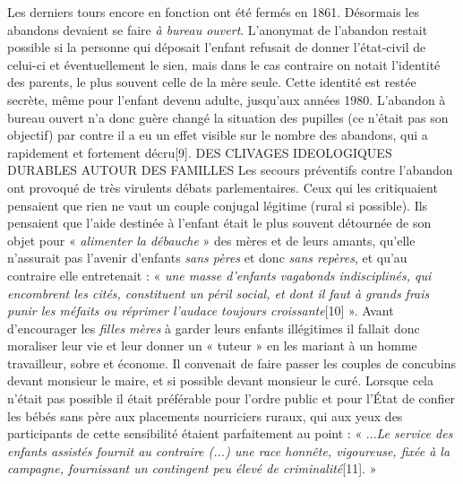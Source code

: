  Les derniers tours encore en fonction ont été fermés en 1861. Désormais les abandons devaient se faire \emph{à bureau ouvert}. L'anonymat de l'abandon restait possible si la personne qui déposait l'enfant refusait de donner l'état-civil de celui-ci et éventuellement le sien, mais dans le cas contraire on notait l'identité des parents, le plus souvent celle de la mère seule. Cette identité est restée secrète, même pour l'enfant devenu adulte, jusqu'aux années 1980. L'abandon à bureau ouvert n'a donc guère changé la situation des pupilles (ce n'était pas son objectif) par contre il a eu un effet visible sur le nombre des abandons, qui a rapidement et fortement décru[9].
DES CLIVAGES IDEOLOGIQUES DURABLES AUTOUR DES FAMILLES
 Les secours préventifs contre l'abandon ont provoqué de très virulents débats parlementaires. Ceux qui les critiquaient pensaient que rien ne vaut un couple conjugal légitime (rural si possible). Ils pensaient que l'aide destinée à l'enfant était le plus souvent détournée de son objet pour « \emph{ alimenter la débauche} » des mères et de leurs amants, qu'elle n'assurait pas l'avenir d'enfants \emph{sans pères} et donc\emph{ sans repères}, et qu'au contraire elle entretenait : « \emph{une masse d'enfants vagabonds indisciplinés, qui encombrent les cités, constituent un péril social, et dont il faut à grands frais punir les méfaits ou réprimer l'audace toujours croissante}[10] ». Avant d'encourager les \emph{filles mères} à garder leurs enfants illégitimes il fallait donc moraliser leur vie et leur donner un « tuteur » en les mariant à un homme travailleur, sobre et économe. Il convenait de faire passer les couples de concubins devant monsieur le maire, et si possible devant monsieur le curé. Lorsque cela n'était pas possible il était préférable pour l'ordre public et pour l'État de confier les bébés sans père aux placements nourriciers ruraux, qui aux yeux des participants de cette sensibilité étaient parfaitement au point : « ...\emph{Le service des enfants assistés fournit au contraire (...) une race honnête, vigoureuse, fixée à la campagne, fournissant un contingent peu élevé de criminalité}[11]. » 

